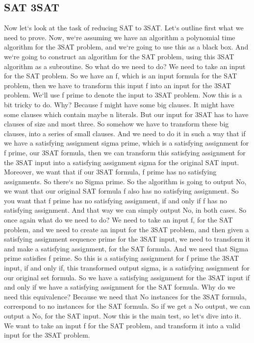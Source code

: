 \subsection{SAT 3SAT}
Now let`s look at the task of reducing SAT to 3SAT\@.
Let`s outline first what we need to prove.
Now, we`re assuming we have an algorithm a polynomial time algorithm for the 3SAT problem, and we`re going to use this as a black box.
And we`re going to construct an algorithm for the SAT problem, using this 3SAT algorithm as a subroutine.
So what do we need to do? We need to take an input for the SAT problem.
So we have an f, which is an input formula for the SAT problem, then we have to transform this input f into an input for the 3SAT problem.
We`ll use f prime to denote the input to 3SAT problem.
Now this is a bit tricky to do.
Why? Because f might have some big clauses.
It might have some clauses which contain maybe n literals.
But our input for 3SAT has to have clauses of size and most three.
So somehow we have to transform these big clauses, into a series of small clauses.
And we need to do it in such a way that if we have a satisfying assignment sigma prime, which is a satisfying assignment for f prime, our 3SAT formula, then we can transform this satisfying assignment for the 3SAT input into a satisfying assignment sigma for the original SAT input.
Moreover, we want that if our 3SAT formula, f prime has no satisfying assignments.
So there`s no Sigma prime.
So the algorithm is going to output No, we want that our original SAT formula f also has no satisfying assignment.
So you want that f prime has no satisfying assignment, if and only if f has no satisfying assignment.
And that way we can simply output No, in both cases.
So once again what do we need to do? We need to take an input f, for the SAT problem, and we need to create an input for the 3SAT problem, and then given a satisfying assignment sequence prime for the 3SAT input, we need to transform it and make a satisfying assignment, for the SAT formula.
And we need that Sigma prime satisfies f prime.
So this is a satisfying assignment for f prime the 3SAT input, if and only if, this transformed output sigma, is a satisfying assignment for our original set formula.
So we have a satisfying assignment for the 3SAT input if and only if we have a satisfying assignment for the SAT formula.
Why do we need this equivalence? Because we need that No instances for the 3SAT formula, correspond to no instances for the SAT formula.
So if we get a No output, we can output a No, for the SAT input.
Now this is the main test, so let`s dive into it.
We want to take an input f for the SAT problem, and transform it into a valid input for the 3SAT problem.

